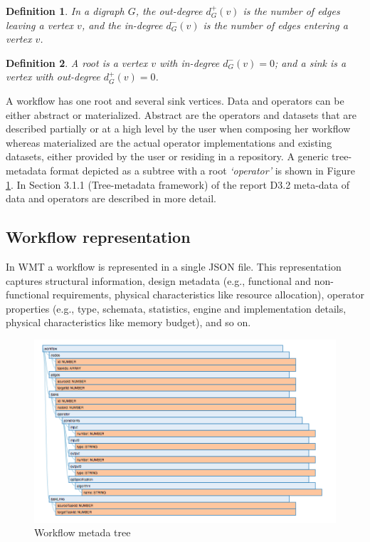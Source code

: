 \documentclass[12pt,openany,onecolumn]{book}
\newtheorem{definition}{Definition}
\begin{document}
\begin{definition}
In a digraph $G$, the out-degree $d_G^{+}(v)$ is the number of edges leaving a vertex $v$, and the in-degree $d_G^{-}(v)$ is the number of edges entering a vertex $v$.
\end{definition}

\begin{definition}
A root is a vertex $v$ with in-degree $d_G^{-}(v) = 0$; and a sink is a vertex with out-degree $d_G^{+}(v) = 0$.
\end{definition}

A workflow has one root and several sink vertices. Data and operators can be either abstract or materialized. Abstract are the operators and datasets that are described partially or at a high level by the user when composing her workflow whereas materialized are the actual operator implementations and existing datasets, either provided by the user or residing in a repository. A generic tree-metadata format depicted as a subtree with a root \emph{`operator'} is shown in Figure \ref{fig:wtree}.
In Section 3.1.1 (Tree-metadata framework) of the report D3.2 \cite{d3.2} meta-data of data and operators are described in more detail.

\subsection{Workflow representation}\label{sec:format}
In WMT a workflow is represented in a single JSON file. 
This representation captures structural information, design metadata (e.g., functional and non-functional requirements, physical characteristics like resource allocation), operator properties (e.g., type, schemata, statistics, engine and implementation details, physical characteristics like memory budget), and so on.

\begin{figure}[h]
\centering
\includegraphics[width=\linewidth]{figs/wtree}
\caption{Workflow metada tree}\label{fig:wtree}
\end{figure}
\end{document}
